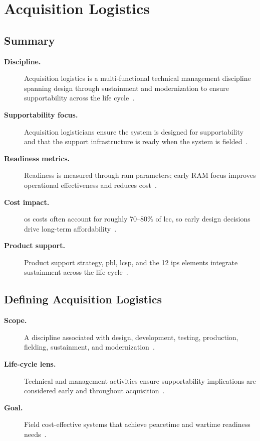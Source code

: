 \documentclass[../main.tex]{subfiles}
\begin{document}
\section{Acquisition Logistics}

\subsection{Summary}
\begin{description}
  \item[\textbf{Discipline.}] Acquisition logistics is a multi-functional technical management discipline spanning design through sustainment and modernization to ensure supportability across the life cycle~\autocite{edo-3-5-4-acquisition-logistics-2025}.
  \item[\textbf{Supportability focus.}] Acquisition logisticians ensure the system is designed for supportability and that the support infrastructure is ready when the system is fielded~\autocite{edo-3-5-4-acquisition-logistics-2025}.
  \item[\textbf{Readiness metrics.}] Readiness is measured through \ac{ram} parameters; early RAM focus improves operational effectiveness and reduces cost~\autocite{edo-3-5-4-acquisition-logistics-2025}.
  \item[\textbf{Cost impact.}] \ac{os} costs often account for roughly 70--80\% of \ac{lcc}, so early design decisions drive long-term affordability~\autocite{edo-3-5-4-acquisition-logistics-2025}.
  \item[\textbf{Product support.}] Product support strategy, \ac{pbl}, \ac{lcsp}, and the 12 \ac{ips} elements integrate sustainment across the life cycle~\autocite{edo-3-5-4-acquisition-logistics-2025,DoDI5000-91}.
\end{description}

\subsection{Defining Acquisition Logistics}
\begin{description}
  \item[\textbf{Scope.}] A discipline associated with design, development, testing, production, fielding, sustainment, and modernization~\autocite{edo-3-5-4-acquisition-logistics-2025}.
  \item[\textbf{Life-cycle lens.}] Technical and management activities ensure supportability implications are considered early and throughout acquisition~\autocite{edo-3-5-4-acquisition-logistics-2025}.
  \item[\textbf{Goal.}] Field cost-effective systems that achieve peacetime and wartime readiness needs~\autocite{edo-3-5-4-acquisition-logistics-2025}.
\end{description}
\end{document}
